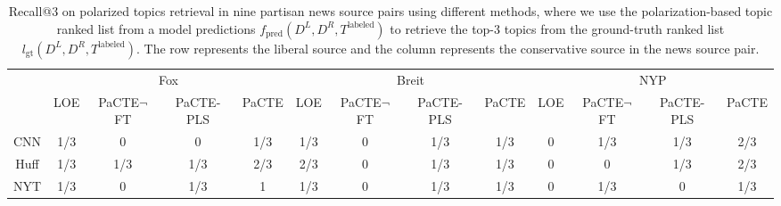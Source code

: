 \documentclass[11pt]{article}
\begin{document}
\begin{table}[ht]
\centering
\small
\addtolength{\tabcolsep}{-3pt}
\begin{tabular}{ccccc|cccc|cccc}
\hline
     & \multicolumn{4}{c|}{Fox}            & \multicolumn{4}{c|}{Breit}          & \multicolumn{4}{c}{NYP}            \\
     
     & {\scriptsize LOE} & {\scriptsize PaCTE$\neg$FT} & {\scriptsize PaCTE-PLS} & {\scriptsize PaCTE} & {\scriptsize LOE} & {\scriptsize PaCTE$\neg$FT} & {\scriptsize PaCTE-PLS} & {\scriptsize PaCTE} & {\scriptsize LOE} & {\scriptsize PaCTE$\neg$FT} & {\scriptsize PaCTE-PLS} & {\scriptsize PaCTE} \\ \hline
CNN  & 1/3   & 0        & 0         & 1/3     & 1/3   & 0        & 1/3        & 1/3     & 0   & 1/3        & 1/3         & 2/3     \\
Huff &  1/3   &     1/3     &     1/3      &  2/3     &  2/3   &     0     &     1/3      &    1/3   &  0   &    0      &     1/3      &    2/3   \\
NYT  &   1/3  &      0    &      1/3     &   1    &   1/3  &     0     &     1/3      &    1/3   &  0   &     1/3     &    0       &   1/3   \\ \hline
\end{tabular}
\addtolength{\tabcolsep}{3pt}
\caption{Recall@3 on polarized topics retrieval in nine partisan news source pairs using different methods, where we use the polarization-based topic ranked list from a model predictions $f_{\text{pred}}(D^L, D^R, T^{\text{labeled}})$ to retrieve the top-3 topics from the ground-truth ranked list $l_{\text{gt}}(D^L, D^R, T^{\text{labeled}})$. The row represents the liberal source and the column represents the conservative source in the news source pair.}
\label{tab:res-pola-retrieve}
\end{table}
\end{document}

